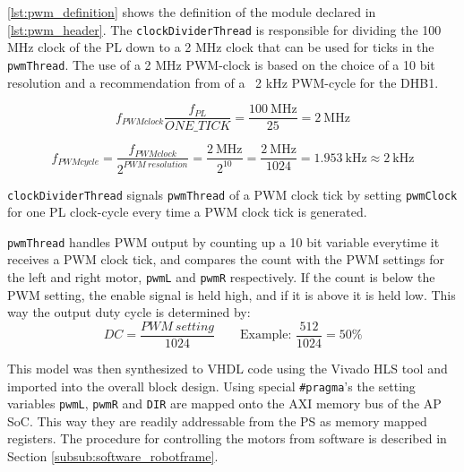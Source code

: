 \documentclass[Main]{subfiles}
\begin{document}
			

			\autoref{lst:pwm_definition} shows the definition of the module declared in \autoref{lst:pwm_header}.
			The \texttt{clockDividerThread} is responsible for dividing the 100 MHz clock of the PL down to a 2 MHz clock that can be used for ticks in the \texttt{pwmThread}.
			The use of a 2 MHz PWM-clock is based on the choice of a 10 bit resolution and a recommendation from \cite{Digilent2013} of a ~2 kHz PWM-cycle for the DHB1.

			\begin{equation}
				f_{PWMclock}
				\frac{f_{PL}}{ONE\_TICK} =
				\frac{100\ \text{MHz}}{25} =
				2\ \text{MHz}
			\end{equation}

			\begin{equation}
				f_{PWMcycle} =
				\frac{f_{PWMclock}}{2^{PWM\ resolution}} =
				\frac{2\ \text{MHz}}{2^{10}} =
				\frac{2\ \text{MHz}}{1024} =
				1.953\ \text{kHz}
				\approx 2\ \text{kHz}
			\end{equation}

			\texttt{clockDividerThread} signals \texttt{pwmThread} of a PWM clock tick by setting \texttt{pwmClock} for one PL clock-cycle every time a PWM clock tick is generated.

			\texttt{pwmThread} handles PWM output by counting up a 10 bit variable everytime it receives a PWM clock tick, and compares the count with the PWM settings for the left and right motor, \texttt{pwmL} and \texttt{pwmR} respectively.
			If the count is below the PWM setting, the enable signal is held high, and if it is above it is held low.
			This way the output duty cycle is determined by:
			\begin{equation}
				DC = \frac{PWM\ setting}{1024}
				\quad \quad \text{Example: }
				\frac{512}{1024} = 50\%
			\end{equation}

			This model was then synthesized to VHDL code using the Vivado HLS tool and imported into the overall block design.
			Using special \texttt{\#pragma}'s the setting variables \texttt{pwmL}, \texttt{pwmR} and \texttt{DIR} are mapped onto the AXI memory bus of the AP SoC.
			This way they are readily addressable from the PS as memory mapped registers.
			The procedure for controlling the motors from software is described in Section \ref{subsub:software_robotframe}.
\end{document}

